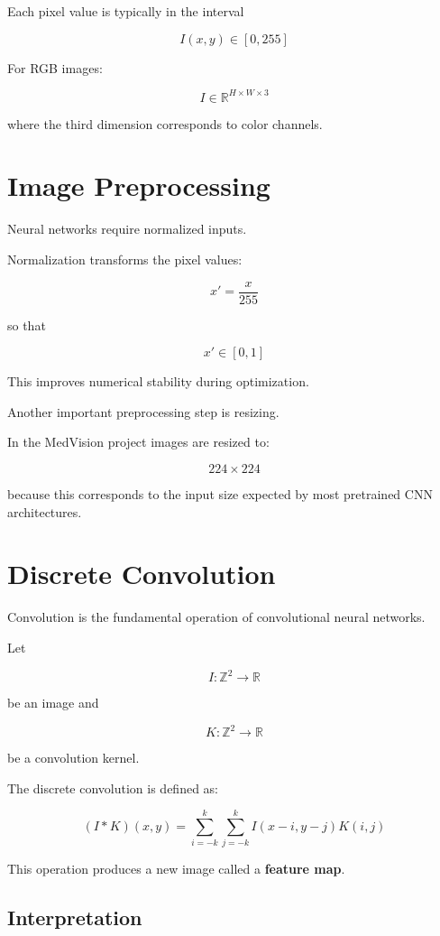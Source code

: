﻿\documentclass[11pt]{article}
\begin{document}
Each pixel value is typically in the interval

\[
I(x,y) \in [0,255]
\]

For RGB images:

\[
I \in \mathbb{R}^{H \times W \times 3}
\]

where the third dimension corresponds to color channels.

\section{Image Preprocessing}

Neural networks require normalized inputs.

Normalization transforms the pixel values:

\[
x' = \frac{x}{255}
\]

so that

\[
x' \in [0,1]
\]

This improves numerical stability during optimization.

Another important preprocessing step is resizing.

In the MedVision project images are resized to:

\[
224 \times 224
\]

because this corresponds to the input size expected by most pretrained CNN architectures.

\section{Discrete Convolution}

Convolution is the fundamental operation of convolutional neural networks.

Let

\[
I : \mathbb{Z}^2 \rightarrow \mathbb{R}
\]

be an image and

\[
K : \mathbb{Z}^2 \rightarrow \mathbb{R}
\]

be a convolution kernel.

The discrete convolution is defined as:

\[
(I * K)(x,y)
=
\sum_{i=-k}^{k}
\sum_{j=-k}^{k}
I(x-i,y-j)K(i,j)
\]

This operation produces a new image called a \textbf{feature map}.

\subsection{Interpretation}
\end{document}
